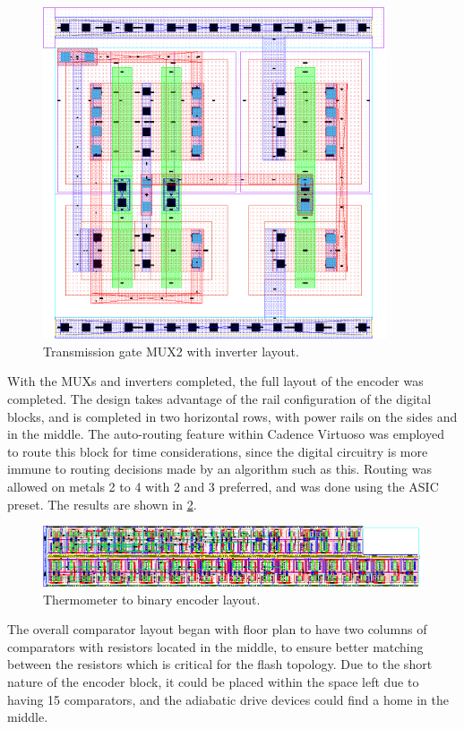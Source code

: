 \documentclass[11pt,letterpaper]{article}
\begin{document}
\begin{figure}[ht!]
    \centering
    \includegraphics[width=4in]{mux2_tg_layout.eps}
    \caption{Transmission gate MUX2 with inverter layout.}\label{fig:mux2_tg_layout}
\end{figure}

With the MUXs and inverters completed, the full layout of the encoder was completed. The design takes advantage of the rail configuration of the digital blocks, and is completed in two horizontal rows, with power rails on the sides and in the middle. The auto-routing feature within Cadence Virtuoso was employed to route this block for time considerations, since the digital circuitry is more immune to routing decisions made by an algorithm such as this. Routing was allowed on metals 2 to 4 with 2 and 3 preferred, and was done using the ASIC preset. The results are shown in \cref{fig:layout_t2b}.

\begin{figure}[ht!]
    \centering
    \includegraphics[width=\textwidth]{t2b_layout.eps}
    \caption{Thermometer to binary encoder layout.}\label{fig:layout_t2b}
\end{figure}

The overall comparator layout began with floor plan to have two columns of comparators with resistors located in the middle, to ensure better matching between the resistors which is critical for the flash topology. Due to the short nature of the encoder block, it could be placed within the space left due to having 15 comparators, and the adiabatic drive devices could find a home in the middle.
\end{document}
